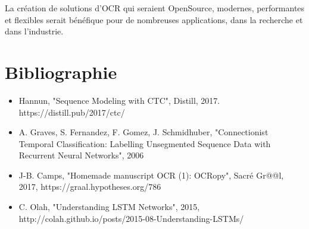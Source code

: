 \documentclass{report}
\begin{document}
La création de solutions d'OCR qui seraient OpenSource, modernes, performantes et flexibles serait bénéfique pour de nombreuses applications, dans la recherche et dans l'industrie.

\chapter{Bibliographie}

\begin{itemize}
	\item Hannun, "Sequence Modeling with CTC", Distill, 2017. https://distill.pub/2017/ctc/
	\item A. Graves, S. Fernandez, F. Gomez, J. Schmidhuber, "Connectionist Temporal Classification: Labelling Unsegmented Sequence Data with Recurrent Neural Networks", 2006
	\item J-B. Camps, "Homemade manuscript OCR (1): OCRopy", Sacré Gr@@l, 2017, https://graal.hypotheses.org/786
	\item C. Olah, "Understanding LSTM Networks", 2015, http://colah.github.io/posts/2015-08-Understanding-LSTMs/
\end{itemize}
		
\appendix
\end{document}
